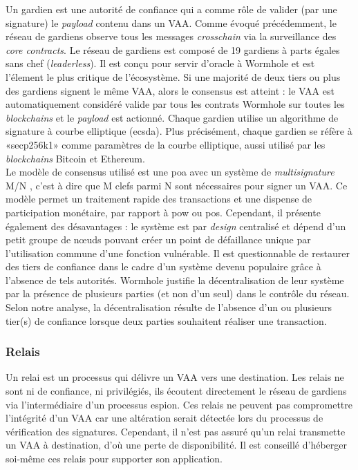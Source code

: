 Un gardien \cite{wormholeGuardian} est une autorité de confiance qui a comme rôle de valider 
(par une signature) le \textit{payload} contenu dans un VAA.
Comme évoqué précédemment, le réseau de gardiens observe tous les messages \textit{crosschain} via la 
surveillance des \textit{core contracts}.
Le réseau de gardiens est composé de 19 gardiens à parts égales sans chef (\textit{leaderless}).
Il est conçu pour servir d'oracle à \gls{Wormhole} et est l'élement le plus critique de l'écosystème.
Si une majorité de deux tiers ou plus des gardiens signent le même VAA, alors le consensus est atteint : 
le VAA est automatiquement considéré valide par  tous les contrats \gls{Wormhole} sur toutes les 
\textit{\gls{blockchain}s} et le \textit{payload} est actionné. 
Chaque gardien utilise un algorithme de signature à courbe elliptique (\acrshort{ecsda}).
Plus précisément, chaque gardien se réfère à «secp256k1» comme paramètres de la courbe elliptique, 
aussi utilisé par les \textit{\gls{blockchain}s} \gls{Bitcoin} et \gls{Ethereum}.\\
Le modèle de consensus utilisé est une \acrshort{poa} avec un système de 
\textit{multisignature} M/N \cite{wormholeChainswap}, c'est à dire que M clefs parmi N sont nécessaires 
pour signer un VAA. Ce modèle permet un traitement rapide des transactions et une dispense de participation monétaire, par rapport à \acrshort{pow} ou \acrshort{pos}. Cependant, il présente également des désavantages : le système est par 
\textit{design} centralisé et dépend d'un petit groupe de nœuds pouvant créer un point de 
défaillance unique par l'utilisation commune d'une fonction vulnérable. Il est questionnable de restaurer des tiers de confiance dans le cadre d'un système 
devenu populaire grâce à l'absence de tels autorités. \gls{Wormhole} justifie la décentralisation de leur 
système \cite{wormholeGuardian} par la présence de plusieurs parties (et non d'un seul) dans le contrôle du réseau.
Selon notre analyse, la décentralisation résulte de l'absence d'un ou plusieurs tier(s) de confiance lorsque deux parties 
souhaitent réaliser une transaction.

\subsubsection{Relais}

Un relai \cite{wormholeRelayer} est un processus qui délivre un VAA vers une destination.
Les relais ne sont ni de confiance, ni privilégiés, ils écoutent directement le réseau de gardiens 
via l'intermédiaire d'un processus espion. Ces relais ne peuvent pas compromettre l'intégrité d'un VAA 
car une altération serait détectée lors du processus de vérification des signatures. Cependant, il n'est 
pas assuré qu'un relai transmette un VAA à destination, d'où une perte de disponibilité. Il est conseillé
d'héberger soi-même ces relais pour supporter son application.


